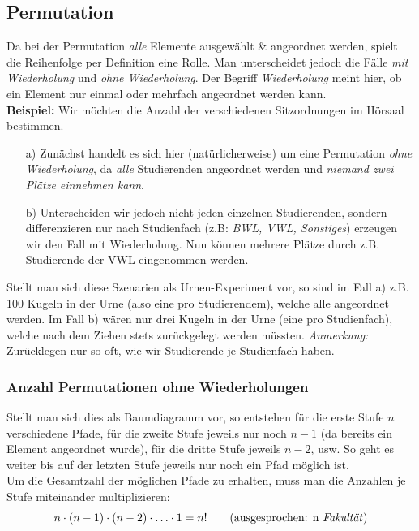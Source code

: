 \documentclass[a4paper]{article}
\begin{document}
\subsection{Permutation}\label{sec:perm}
Da bei der Permutation \textit{alle} Elemente ausgewählt \& angeordnet werden, spielt die Reihenfolge per Definition eine Rolle. Man unterscheidet jedoch die Fälle \textit{mit Wiederholung} und \textit{ohne Wiederholung}. Der Begriff \textit{Wiederholung} meint hier, ob ein Element nur einmal oder mehrfach angeordnet werden kann.\\
\textbf{Beispiel:} Wir möchten die Anzahl der verschiedenen Sitzordnungen im Hörsaal bestimmen.
\begin{itemize}
    \item[a)] Zunächst handelt es sich hier (natürlicherweise) um eine Permutation \textit{ohne Wiederholung}, da \textit{alle} Studierenden angeordnet werden und \textit{niemand zwei Plätze einnehmen kann}.
    \item[b)] Unterscheiden wir jedoch nicht jeden einzelnen Studierenden, sondern differenzieren nur nach Studienfach (z.B: \textit{BWL, VWL, Sonstiges}) erzeugen wir den Fall mit Wiederholung. Nun können mehrere Plätze durch z.B. Studierende der VWL eingenommen werden.
\end{itemize}
Stellt man sich diese Szenarien als Urnen-Experiment vor, so sind im Fall a) z.B. 100 Kugeln in der Urne (also eine pro Studierendem), welche alle angeordnet werden. Im Fall b) wären nur drei Kugeln in der Urne (eine pro Studienfach), welche nach dem Ziehen stets zurückgelegt werden müssten. \textit{Anmerkung:} Zurücklegen nur so oft, wie wir Studierende je Studienfach haben.

\subsubsection{Anzahl Permutationen ohne Wiederholungen}\label{sec:perm-ohne}
Stellt man sich dies als Baumdiagramm vor, so entstehen für die erste Stufe $n$ verschiedene Pfade, für die zweite Stufe jeweils nur noch $n-1$ (da bereits ein Element angeordnet wurde), für die dritte Stufe jeweils $n-2$, usw. So geht es weiter bis auf der letzten Stufe jeweils nur noch ein Pfad möglich ist.\\
Um die Gesamtzahl der möglichen Pfade zu erhalten, muss man die Anzahlen je Stufe miteinander multiplizieren: 
$$n \cdot (n-1) \cdot (n-2) \cdot \hdots \cdot 1 = n! \qquad \mbox{(ausgesprochen: n \textit{Fakultät})}$$
\end{document}
